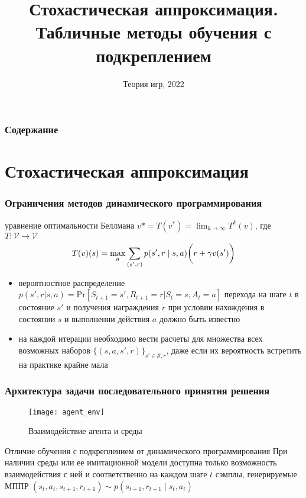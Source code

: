 \documentclass[notheorems]{beamer} %
\title[Обучение с подкреплением] %
{Стохастическая аппроксимация. \\ Табличные методы обучения с подкреплением}
\date[Теория игр] %
{Теория игр,  2022}
\begin{document}
\frame{\titlepage}


\begin{frame}
\frametitle{Содержание}%
\tableofcontents
\end{frame}
\section{Стохастическая аппроксимация}
\begin{frame}
\frametitle{Ограничения методов динамического программирования}

\begin{block}{уравнение оптимальности Беллмана}	
	$v*=T(v^*) = \lim_{k \to \infty}T^k(v)$, где $T : \mathcal{V} \to \mathcal{V}$ 
	$$T(v)(s) = \max_a \sum_{(s',r)}p(s',r \mid s,a)\bigg{(}r + \gamma v(s')\bigg{)} $$
\end{block}
\begin{itemize}
	\item вероятностное распределение  $p(s',r|s,a)=  \text{Pr}[S_{t+1}=s', R_{t+1}=r|S_t=s, A_t=a ]$ перехода на шаге $t$  в состояние $s'$ и получения награждения  $r$ при условии нахождения в состоянии $s$ и выполнении действия $a$ должно быть известно 
	\item на каждой итерации необходимо вести расчеты для множества всех возможных наборов $\{(s,a,s',r)\}_{s' \in \mathcal{S}, r}$, даже если  их вероятность встретить на практике крайне мала
\end{itemize}
\end{frame}

\begin{frame}
	\frametitle{ Архитектура задачи последовательного принятия решения}
	
	\begin{figure}
		\centering
		\texttt{[image: agent\_env]}
		\caption{Взаимодействие агента и среды}
		\label{fig:question}
	\end{figure}
\begin{alertblock}{Отличие обучения с подкреплением от динамического программирования}
	При наличии среды или ее имитационной модели доступна только возможность взаимодействия с ней и соответственно на каждом шаге $t$ сэмплы, генерируемые МППР $(s_t, a_t, s_{t+1}, r_{t+1}) \sim p(s_{t+1}, r_{t+1} \mid s_t, a_t)$
\end{alertblock}

	
\end{frame}
\end{document}
